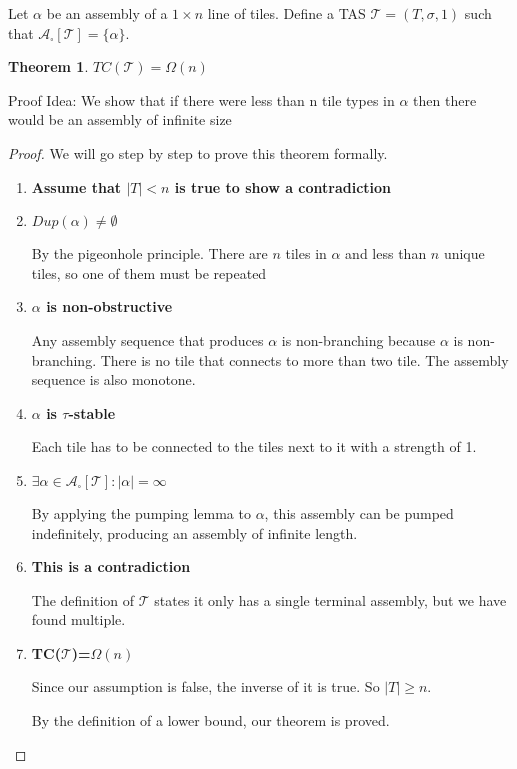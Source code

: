 \documentclass[12pt]{article}
\newtheorem{theorem}{Theorem}
\newcommand{\tTerm}{\mathcal{A}_\square[\mathcal{T}]}
\begin{document}


Let $\alpha$ be an assembly of a $1 \times n$ line of tiles. Define a TAS $\mathcal{T} = (T, \sigma, 1)$ such that $\tTerm = \{ \alpha \}$. 

\begin{theorem}
	$TC(\mathcal{T}) = \Omega(n)$
\end{theorem}

Proof Idea:  We show that if there were less than n tile types in $\alpha$ then there would be an assembly of infinite size

\begin{proof}
	We will go step by step to prove this theorem formally.

	\begin{enumerate}
		\item \textbf{Assume that $|T| < n$ is true to show a contradiction}

		\item \textbf{$Dup(\alpha) \neq \emptyset$}

		By the pigeonhole principle. There are $n$ tiles in $\alpha$ and less than $n$ unique tiles, so one of them must be repeated

		\item \textbf{$\alpha$ is non-obstructive}


            Any assembly sequence that produces $\alpha$ is non-branching because $\alpha$ is non-branching. There is no tile that connects to more than two tile. The assembly sequence is also monotone. 

        \item \textbf{$\alpha$ is $\tau$-stable}

            Each tile has to be connected to the tiles next to it with a strength of 1. 


		\item \textbf{$\exists \alpha \in \mathcal{A}_\square[\mathcal{T}] : |\alpha| = \infty $}

            By applying the pumping lemma to $\alpha$, this assembly can be pumped indefinitely, producing an assembly of infinite length.

		\item \textbf{This is a contradiction}

		The definition of $\mathcal{T}$ states it only has a single terminal assembly, but we have found multiple.

		\item \textbf{TC($\mathcal{T}$)=$\Omega(n)$}

		Since our assumption is false, the inverse of it is true. So $|T| \geq n$.

		By the definition of a lower bound, our theorem is proved.

	\end{enumerate}
\end{proof}
\end{document}
